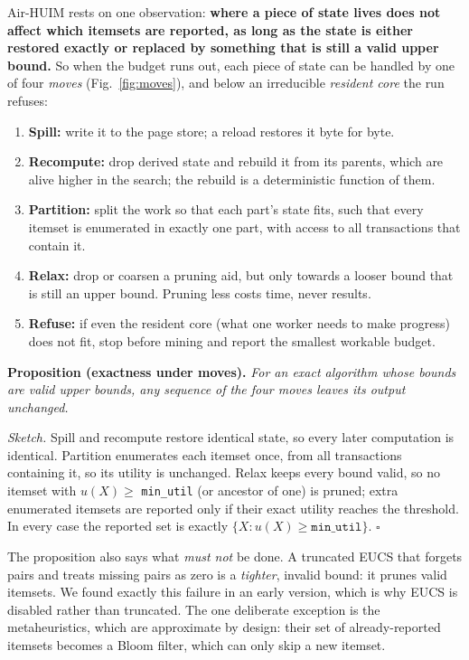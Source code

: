 \documentclass[conference]{IEEEtran}
\begin{document}
Air-HUIM rests on one observation: \textbf{where a piece of state lives does not affect which
itemsets are reported, as long as the state is either restored exactly or replaced by something
that is still a valid upper bound.} So when the budget runs out, each piece of state can be handled
by one of four \emph{moves} (Fig.~\ref{fig:moves}), and below an irreducible \emph{resident core}
the run refuses:

\begin{enumerate}
\item \textbf{Spill:} write it to the page store; a reload restores it byte for byte.
\item \textbf{Recompute:} drop derived state and rebuild it from its parents, which are alive
higher in the search; the rebuild is a deterministic function of them.
\item \textbf{Partition:} split the work so that each part's state fits, such that every itemset is
enumerated in exactly one part, with access to all transactions that contain it.
\item \textbf{Relax:} drop or coarsen a pruning aid, but only towards a looser bound that is still
an upper bound. Pruning less costs time, never results.
\item[] \hspace{-1.3em}\textbf{Refuse:} if even the resident core (what one worker needs to make
progress) does not fit, stop before mining and report the smallest workable budget.
\end{enumerate}

\textbf{Proposition (exactness under moves).} \emph{For an exact algorithm whose bounds are valid
upper bounds, any sequence of the four moves leaves its output unchanged.}

\emph{Sketch.} Spill and recompute restore identical state, so every later computation is
identical. Partition enumerates each itemset once, from all transactions containing it, so its
utility is unchanged. Relax keeps every bound valid, so no itemset with $u(X)\ge$
\texttt{min\_util} (or ancestor of one) is pruned; extra enumerated itemsets are reported only if
their exact utility reaches the threshold. In every case the reported set is exactly
$\{X : u(X) \ge \texttt{min\_util}\}$. \hfill$\square$

The proposition also says what \emph{must not} be done. A truncated EUCS that forgets pairs and
treats missing pairs as zero is a \emph{tighter}, invalid bound: it prunes valid itemsets. We
found exactly this failure in an early version, which is why EUCS is disabled rather than
truncated. The one deliberate exception is the metaheuristics, which are approximate by design:
their set of already-reported itemsets becomes a Bloom filter, which can only skip a new itemset.
\end{document}
